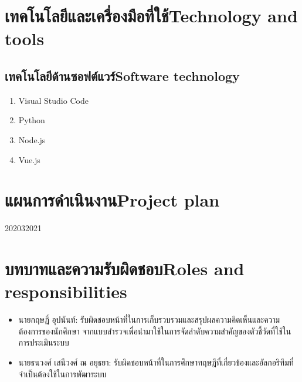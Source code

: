 \section{\ifcpe เทคโนโลยีและเครื่องมือที่ใช้\else Technology and tools\fi}


\subsection{\ifcpe เทคโนโลยีด้านซอฟต์แวร์\else Software technology\fi}
\begin{enumerate}
    \item Visual Studio Code
    \item Python
    \item Node.js
    \item Vue.js
\end{enumerate}

\section{\ifcpe แผนการดำเนินงาน\else Project plan\fi}

\begin{plan}{7}{2020}{3}{2021}
\end{plan}

\section{\ifcpe บทบาทและความรับผิดชอบ\else Roles and responsibilities\fi}
\begin{itemize}
\item นายกฤษฏิ์ อุปนันท์: รับผิดชอบหน้าที่ในการเก็บรวบรวมและสรุปผลความคิดเห็นและความต้องการของนักศึกษา
จากแบบสำรวจเพื่อนำมาใช้ในการจัดลำดับความสำคัญของตัวชี้วัดที่ใช้ในการประเมินระบบ
\item นายธนวงศ์ เสนีวงศ์ ณ อยุธยา: รับผิดชอบหน้าที่ในการศึกษาทฤษฎีที่เกี่ยวข้องและอัลกอริทึมที่จำเป็นต้องใช้ในการพัฒาระบบ
\end{itemize}

